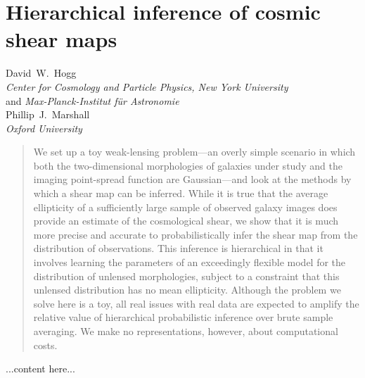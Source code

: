\documentclass[12pt]{article}
\begin{document}
\section*{Hierarchical inference of cosmic shear maps}
\noindent
David~W.~Hogg \\
\textsl{Center for Cosmology and Particle Physics, New York University} \\
and \textsl{Max-Planck-Institut f\"ur Astronomie} \\[1ex]
Phillip~J.~Marshall \\
\textsl{Oxford University}

\begin{abstract}
We set up a toy weak-lensing problem---an overly simple scenario in
which both the two-dimensional morphologies of galaxies under study
and the imaging point-spread function are Gaussian---and look at the
methods by which a shear map can be inferred.  While it is true that
the average ellipticity of a sufficiently large sample of observed
galaxy images does provide an estimate of the cosmological shear, we
show that it is much more precise and accurate to probabilistically
infer the shear map from the distribution of observations.  This
inference is hierarchical in that it involves learning the parameters
of an exceedingly flexible model for the distribution of unlensed
morphologies, subject to a constraint that this unlensed distribution
has no mean ellipticity.  Although the problem we solve here is a toy,
all real issues with real data are expected to amplify the relative
value of hierarchical probabilistic inference over brute sample
averaging.  We make no representations, however, about computational
costs.
\end{abstract}

...content here...
\end{document}
